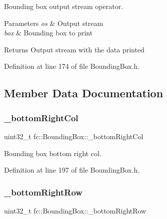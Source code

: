 Bounding box output stream operator. 


\begin{DoxyParams}{Parameters}
{\em os} & Output stream \\
\hline
{\em box} & Bounding box to print \\
\hline
\end{DoxyParams}
\begin{DoxyReturn}{Returns}
Output stream with the data printed 
\end{DoxyReturn}


Definition at line 174 of file Bounding\+Box.\+h.



\subsection{Member Data Documentation}
\mbox{\label{classfc_1_1BoundingBox_a1ac6bfcd930956a8cf7e580b83e88147}} 
\subsubsection{\texorpdfstring{\+\_\+bottom\+Right\+Col}{\_bottomRightCol}}
{\footnotesize\ttfamily uint32\+\_\+t fc\+::\+Bounding\+Box\+::\+\_\+bottom\+Right\+Col\hspace{0.3cm}{\ttfamily [private]}}



Bounding box bottom right col. 



Definition at line 197 of file Bounding\+Box.\+h.

\mbox{\label{classfc_1_1BoundingBox_a9797ed1e8272f512abd7b2c0598766e5}} 
\subsubsection{\texorpdfstring{\+\_\+bottom\+Right\+Row}{\_bottomRightRow}}
{\footnotesize\ttfamily uint32\+\_\+t fc\+::\+Bounding\+Box\+::\+\_\+bottom\+Right\+Row\hspace{0.3cm}{\ttfamily [private]}}



